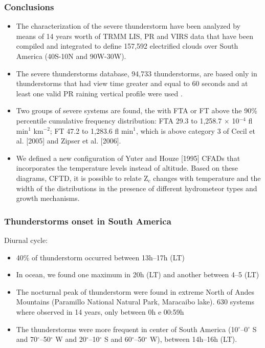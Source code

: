 \documentclass[smaller]{beamer}
\begin{document}
\begin{frame}
\frametitle{Conclusions}

\begin{itemize}
\item The characterization of the severe thunderstorm have been analyzed by means of 14 years worth of TRMM LIS, PR and VIRS data that have been compiled and integrated to define 157,592 electrified clouds over South America (40S-10N and 90W-30W). 

\item  The severe thunderstorms database, 94,733 thunderstorms, are based only in thunderstorms that had view time greater and equal to 60 seconds and at least one valid PR raining vertical profile were used . 

\item Two groups of severe systems are found, the with FTA or FT  above the 90\% percentile cumulative frequency distribution:  FTA 29.3 to 1,258.7 $\times$ 10$^{-4}$ fl min$^{1}$ km$^{-2}$; FT 47.2 to 1,283.6 fl min$^{1}$, which is above category 3 of Cecil et al. [2005] and Zipser et al. [2006].


\item We defined a new configuration of Yuter and Houze [1995] CFADs that incorporates the temperature levels instead of altitude. Based on these diagrams, CFTD, it is possible to relate Z$_c$ changes with temperature and the width of the distributions in the presence of different hydrometeor types and growth mechanisms. 
 

\end{itemize}
\end{frame}


\begin{frame}
\frametitle{Thunderstorms onset in South America}
\Large{Diurnal cycle:}
\begin{itemize}
\item 40\% of thunderstorm occurred between 13h--17h (LT)
\item In ocean, we found one maximum in 20h (LT) and another between  4--5 (LT)
\item The nocturnal peak of thunderstorm were found in extreme North of Andes Mountains (Paramillo National Natural Park, Maracaibo lake). 630 systems where observed in 14 years, only between 0h e 00:59h
\item The thunderstorms were more frequent in center of South America (10$^{\circ}$--0$^{\circ}$ S and 70$^{\circ}$--50$^{\circ}$ W  and 20$^{\circ}$--10$^{\circ}$ S and 60$^{\circ}$--50$^{\circ}$ W), between 14h--16h (LT).
\end{itemize}

\end{frame}
\end{document}
